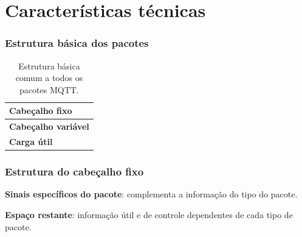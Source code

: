 \documentclass[12pt]{beamer}
\begin{document}
\section{Características técnicas}\label{Características técnicas}

\begin{frame}
    \frametitle{Estrutura básica dos pacotes}

    \begin{table}[h!]\caption{Estrutura básica comum a todos os pacotes MQTT.}
        \centering
        \begin{tabular}{|l|}
            \hline
            \textbf{Cabeçalho fixo}     \\ \hline
            \textbf{Cabeçalho variável} \\ \hline
            \textbf{Carga útil}         \\ \hline
        \end{tabular}
    \end{table}
    
\end{frame}

\begin{frame}
    \frametitle{Estrutura do cabeçalho fixo}
    \begin{table}[h!]\caption{Estrutura do cabeçalho fixo utilizado no protocolo MQTT.}
        \centering
    \end{table}
    
\textbf{Sinais específicos do pacote}: complementa a informação do tipo do pacote.

\textbf{Espaço restante}: informação útil e de controle dependentes de cada tipo de pacote.

\end{frame}
\end{document}
